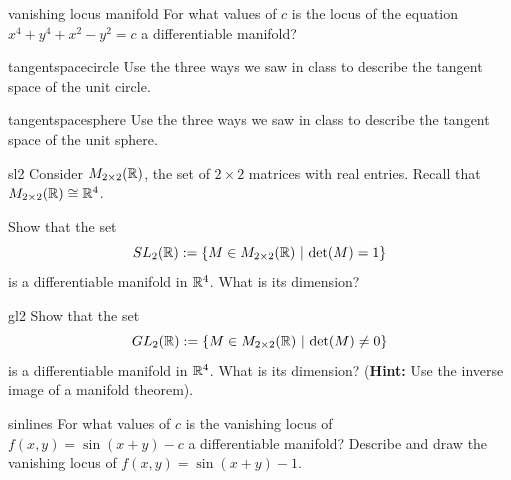 \begin{problem}{vanishing locus manifold}
    For what values of $c$ is the locus of the equation $x^4+y^4+x^2-y^2 =c$ a differentiable manifold?
\end{problem}

\begin{problem}{tangentspacecircle}
    Use the three ways we saw in class to describe the tangent space of the unit circle.
\end{problem}

\begin{problem}{tangentspacesphere}
    Use the three ways we saw in class to describe the tangent space of the unit sphere.
\end{problem}

\begin{problem}{sl2}
    Consider $M_{2 \times 2}(\mathbb{R})$, the set of $2 \times 2$ matrices with real entries.  Recall that $M_{2 \times 2}(\mathbb{R}) \cong \mathbb{R}^4$.

    Show that the set $$SL_2(\mathbb{R}) := \{ M \in M_{2 \times 2}(\mathbb{R}) \ | \ \textnormal{det}(M) = 1  \}$$ is a differentiable manifold in $\mathbb{R}^4$.  What is its dimension?
\end{problem}

\begin{problem}{gl2}
    Show that the set $$GL_2(\R) := \{ M \in M_{2 \times 2}(\R) \ | \ \textnormal{det}(M) \neq 0  \}$$ is a differentiable manifold in $\mathbb{R}^4$.  What is its dimension? (\textbf{Hint:} Use the inverse image of a manifold theorem).
\end{problem}

\begin{problem}{sinlines}
    For what values of $c$ is the vanishing locus of $f(x,y) = \sin(x+y) - c$ a differentiable manifold? 
    Describe and draw the vanishing locus of $f(x,y) = \sin(x+y) - 1$. 
\end{problem}